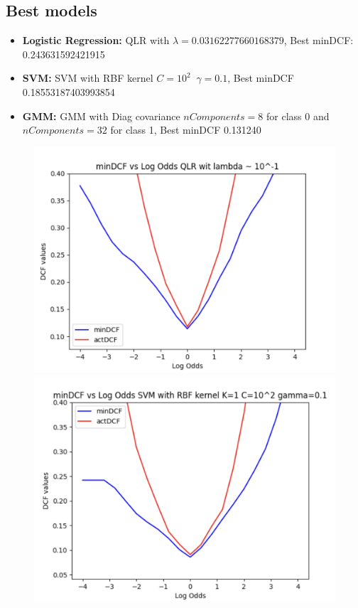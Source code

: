 \documentclass{article}
\begin{document}
\subsection*{Best models}
\begin{itemize}
    \item \textbf{Logistic Regression:} QLR with \(\lambda=0.03162277660168379\), Best minDCF: 0.243631592421915
    \item \textbf{SVM:} SVM with RBF kernel \(C=10^2\;\; \gamma=0.1\), Best minDCF  0.18553187403993854
    \item \textbf{GMM:} GMM with Diag covariance \(nComponents=8\) for class 0 and \(nComponents=32\) for class 1, Best minDCF 0.131240
\end{itemize}
\begin{figure}[H]
    \centering
    \begin{minipage}{.3\textwidth}
        \centering
        \includegraphics[width=\linewidth]{./img/BestQLR.png}
    \end{minipage}%
    \begin{minipage}{.3\textwidth}
        \centering
        \includegraphics[width=\linewidth]{./img/BestSVM.png}

\end{minipage}
\end{figure}
\end{document}
